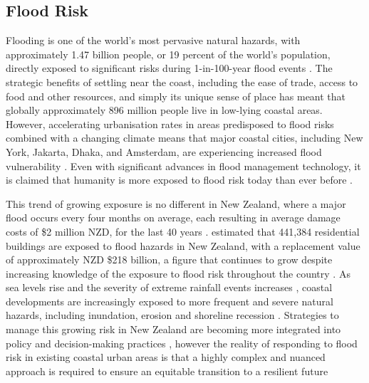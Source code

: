 \subsection{Flood Risk}
Flooding is one of the world’s most pervasive natural hazards, with
approximately 1.47 billion people, or 19 percent of the world’s population,
directly exposed to significant risks during 1-in-100-year flood events
\parencite{IPCC2023}. The strategic benefits of settling near the coast,
including the ease of trade, access to food and other resources, and simply its
unique sense of place has meant that globally approximately 896 million people
live in low-lying coastal areas. However, accelerating urbanisation rates in
areas predisposed to flood risks combined with a changing climate means that
major coastal cities, including New York, Jakarta, Dhaka, and Amsterdam, are
experiencing increased flood vulnerability \parencite{Caljouw2009, Haque2010,
Kim2019, Madajewicz2020}. Even with significant advances in flood management
technology, it is claimed that humanity is more exposed to flood risk today than
ever before \parencite{White2013}.

This trend of growing exposure is no different in New Zealand, where a major
flood occurs every four months on average, each resulting in average damage
costs of \$2 million NZD, for the last 40 years \parencite{CrawfordFlett2022}.
\textcite{Paulik2023} estimated that 441,384 residential buildings are exposed
to flood hazards in New Zealand, with a replacement value of approximately NZD
\$218 billion, a figure that continues to grow despite increasing knowledge of
the exposure to flood risk throughout the country \parencite{Levy2023,
Naish2024, Paulik2023, Hughes2015}. As sea levels rise and the severity of
extreme rainfall events increases \parencite{MfE2023}, coastal developments are
increasingly exposed to more frequent and severe natural hazards, including
inundation, erosion and shoreline recession \parencite{Storey2024}. Strategies
to manage this growing risk in New Zealand are becoming more integrated into
policy and decision-making practices \parencite{Schneider2020, Storey2024,
Storey2025}, however the reality of responding to flood risk in existing coastal
urban areas is that a highly complex and nuanced approach is required to ensure
an equitable transition to a resilient future \parencite{Hughes2015, Logan2020} 

